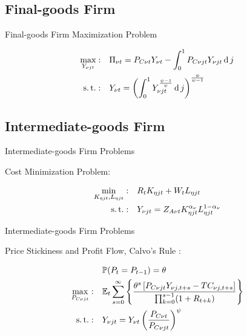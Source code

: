 \documentclass[
presentation.tex
]{subfiles}
\begin{document}

\subsection{Final-goods Firm}

\begin{frame}{Final-goods Firm Maximization Problem}
	
\begin{align}
	\max_{Y_{\nu jt}}: &\quad \Pi_{\nu t} = P_{C\nu t} Y_{\nu t} - \int_{0}^{1} P_{C\nu jt} Y_{\nu jt} \operatorname{d} j \label{eq:reg-final-goods-firm-max-problem} \\
	\operatorname{s.t.}: & \quad Y_{\nu t} = \left( \int_{0}^{1} Y_{\nu jt}^{\frac{\psi-1}{\psi}} \operatorname{d} j \right)^{\frac{\psi}{\psi-1}} \label{eq:reg-final-goods-firm-bundle-rule}
\end{align}
		
\end{frame}


\subsection{Intermediate-goods Firm}

\begin{frame}{Intermediate-goods Firm Problems}
	
	Cost Minimization Problem:	
	
\begin{align}
	\label{eq:reg-int-good-firm-total-cost}
	\min_{K_{\eta jt}, L_{\eta jt}}: \quad & R_t K_{\eta jt} + W_t L_{\eta jt} \\
	\label{eq:reg-int-good-firm-production-function}
	\operatorname{s.t.}: \quad & Y_{\nu jt} = Z_{A\nu t} K_{\eta jt}^{\alpha_\nu} L_{\eta jt}^{1-{\alpha_\nu}}
\end{align}
	
\end{frame}


\begin{frame}{Intermediate-goods Firm Problems}
	
	Price Stickiness and Profit Flow, Calvo's Rule \cite{calvo_staggered_1983}:
	
\begin{align}
	& \quad \mathbb{P}(P_t=P_{t-1})=\theta \\
	\max_{P_{C\nu jt}}: & \quad {\mathbb{E}_{t}} \sum_{s=0}^{\infty} \left\{ \frac{ \theta^s \left[ P_{C\nu jt} Y_{\nu j,t+s} - TC_{\nu j,t+s} \right] }{\prod_{k=0}^{s-1}(1+R_{t+k})} \right\} \label{eq:reg-int-good-firm-optimal-price-problem} \\
	\operatorname{s.t.}: & \quad Y_{\nu jt} = Y_{\nu t} \left( \frac{P_{C\nu t}}{P_{C\nu jt}} \right)^{\psi}
\end{align}
	
\end{frame}
\end{document}
